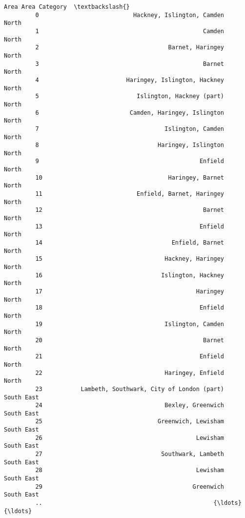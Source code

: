 \documentclass[11pt]{article}
\begin{document}
\begin{Verbatim}[commandchars=\\\{\}]
                                                           Area Area Category  \textbackslash{}
         0                           Hackney, Islington, Camden         North   
         1                                               Camden         North   
         2                                     Barnet, Haringey         North   
         3                                               Barnet         North   
         4                         Haringey, Islington, Hackney         North   
         5                            Islington, Hackney (part)         North   
         6                          Camden, Haringey, Islington         North   
         7                                    Islington, Camden         North   
         8                                  Haringey, Islington         North   
         9                                              Enfield         North   
         10                                    Haringey, Barnet         North   
         11                           Enfield, Barnet, Haringey         North   
         12                                              Barnet         North   
         13                                             Enfield         North   
         14                                     Enfield, Barnet         North   
         15                                   Hackney, Haringey         North   
         16                                  Islington, Hackney         North   
         17                                            Haringey         North   
         18                                             Enfield         North   
         19                                   Islington, Camden         North   
         20                                              Barnet         North   
         21                                             Enfield         North   
         22                                   Haringey, Enfield         North   
         23           Lambeth, Southwark, City of London (part)    South East   
         24                                   Bexley, Greenwich    South East   
         25                                 Greenwich, Lewisham    South East   
         26                                            Lewisham    South East   
         27                                  Southwark, Lambeth    South East   
         28                                            Lewisham    South East   
         29                                           Greenwich    South East   
         ..                                                 {\ldots}           {\ldots}   

\end{Verbatim}
\end{document}
